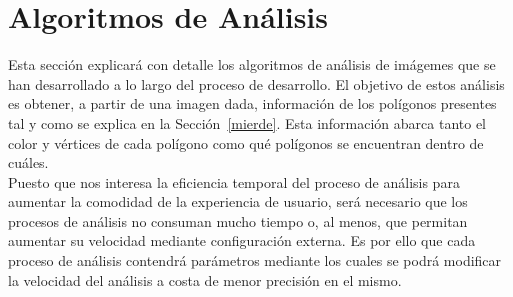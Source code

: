 \section{Algoritmos de Análisis}
\label{sec:algAnalisis}

Esta sección explicará con detalle los algoritmos de análisis de imágemes que se han desarrollado a lo largo del proceso de desarrollo. El objetivo de estos análisis es obtener, a partir de una imagen dada, información de los polígonos presentes tal y como se explica en la Sección~\ref{mierde}. Esta información abarca tanto el color y vértices de cada polígono como qué polígonos se encuentran dentro de cuáles.\\

Puesto que nos interesa la eficiencia temporal del proceso de análisis para aumentar la comodidad de la experiencia de usuario, será necesario que los procesos de análisis no consuman mucho tiempo o, al menos, que permitan aumentar su velocidad mediante configuración externa. Es por ello que cada proceso de análisis contendrá parámetros mediante los cuales se podrá modificar la velocidad del análisis a costa de menor precisión en el mismo.\\

